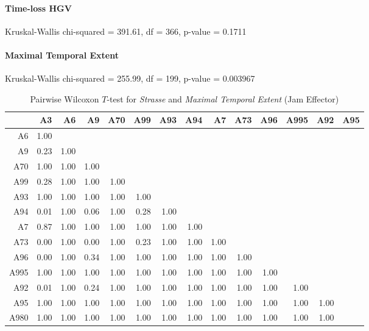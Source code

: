 \paragraph{Time-loss HGV}
Kruskal-Wallis chi-squared = 391.61, df = 366, p-value = 0.1711





\paragraph{Maximal Temporal Extent}
Kruskal-Wallis chi-squared = 255.99, df = 199, p-value = 0.003967

\begin{table}[ht]
	\tiny
	\centering
	\begin{tabular}{rrrrrrrrrrrrrr}
		\toprule
		     & A3 & A6 & A9 & A70 & A99 & A93 & A94 & A7 & A73 & A96 & A995 & A92 & A95 \\ 
		\midrule
		A6   & 1.00 &  &  &  &  &  &  &  &  &  &  &  &  \\ 
		A9   & 0.23 & 1.00 &  &  &  &  &  &  &  &  &  &  &  \\ 
		A70  & 1.00 & 1.00 & 1.00 &  &  &  &  &  &  &  &  &  &  \\ 
		A99  & 0.28 & 1.00 & 1.00 & 1.00 &  &  &  &  &  &  &  &  &  \\ 
		A93  & 1.00 & 1.00 & 1.00 & 1.00 & 1.00 &  &  &  &  &  &  &  &  \\ 
		A94  & 0.01 & 1.00 & 0.06 & 1.00 & 0.28 & 1.00 &  &  &  &  &  &  &  \\ 
		A7   & 0.87 & 1.00 & 1.00 & 1.00 & 1.00 & 1.00 & 1.00 &  &  &  &  &  &  \\ 
		A73  & 0.00 & 1.00 & 0.00 & 1.00 & 0.23 & 1.00 & 1.00 & 1.00 &  &  &  &  &  \\ 
		A96  & 0.00 & 1.00 & 0.34 & 1.00 & 1.00 & 1.00 & 1.00 & 1.00 & 1.00 &  &  &  &  \\ 
		A995 & 1.00 & 1.00 & 1.00 & 1.00 & 1.00 & 1.00 & 1.00 & 1.00 & 1.00 & 1.00 &  &  &  \\ 
		A92  & 0.01 & 1.00 & 0.24 & 1.00 & 1.00 & 1.00 & 1.00 & 1.00 & 1.00 & 1.00 & 1.00 &  &  \\ 
		A95  & 1.00 & 1.00 & 1.00 & 1.00 & 1.00 & 1.00 & 1.00 & 1.00 & 1.00 & 1.00 & 1.00 & 1.00 &  \\ 
		A980 & 1.00 & 1.00 & 1.00 & 1.00 & 1.00 & 1.00 & 1.00 & 1.00 & 1.00 & 1.00 & 1.00 & 1.00 &  \\ 
		\bottomrule
	  \end{tabular}
    \caption{Pairwise Wilcoxon $T$-test for \textit{Strasse} and \textit{Maximal Temporal Extent} (Jam Effector)}
    \label{tbl:wilcoxon_baysis_effector_Strasse_TMax}
\end{table}
